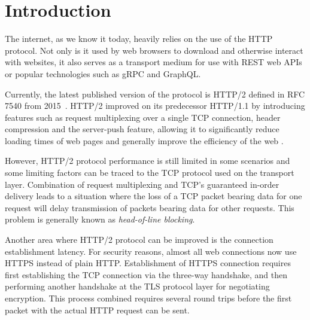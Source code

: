 \chapter{Introduction}

The internet, as we know it today, heavily relies on the use of the HTTP protocol. Not only is it
used by web browsers to download  and otherwise interact with websites, it also serves as a transport
medium for use with REST web APIs or popular technologies such as gRPC and GraphQL\@.

Currently, the latest published version of the protocol is HTTP/2 defined in RFC 7540 from 2015~.
HTTP/2 improved on its predecessor HTTP/1.1  by introducing features such as request multiplexing
over a single TCP connection, header compression and the server-push feature, allowing it to
significantly reduce loading times of web pages and generally improve the efficiency of the web .

However, HTTP/2 protocol performance is still limited in some scenarios and some limiting
factors can be traced to the TCP protocol used on the transport layer.  Combination of request
multiplexing and TCP's guaranteed in-order delivery leads to a situation where the loss of a TCP
packet bearing data for one request will delay transmission of packets bearing data for other
requests. This problem is generally known as \textit{head-of-line blocking}.

Another area where HTTP/2 protocol can be improved is the connection establishment latency. For
security reasons, almost all web connections now use HTTPS instead of plain HTTP\@. 
Establishment of HTTPS connection requires first establishing the TCP connection via the three-way
handshake, and then performing another handshake at the TLS protocol layer for negotiating
encryption. This process combined requires several round trips before the first packet with the
actual HTTP request can be sent. 

